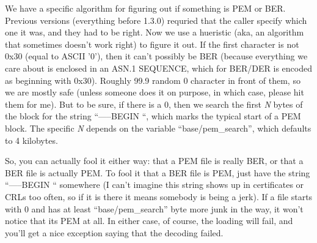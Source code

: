 \documentclass{article}
\begin{document}
We have a specific algorithm for figuring out if something is PEM or
BER. Previous versions (everything before 1.3.0) requried that the
caller specify which one it was, and they had to be right. Now we use
a hueristic (aka, an algorithm that sometimes doesn't work right) to
figure it out. If the first character is not 0x30 (equal to ASCII
'0'), then it can't possibly be BER (because everything we care about
is enclosed in an ASN.1 SEQUENCE, which for BER/DER is encoded as
beginning with 0x30). Roughly 99.9%
random 0 character in front of them, so we are mostly safe (unless
someone does it on purpose, in which case, please hit them for me).
But to be sure, if there is a 0, then we search the first \emph{N}
bytes of the block for the string ``-----BEGIN ``, which marks the
typical start of a PEM block. The specific \emph{N} depends on the
variable ``base/pem\_search'', which defaults to 4 kilobytes.

So, you can actually fool it either way: that a PEM file is really
BER, or that a BER file is actually PEM. To fool it that a BER file is
PEM, just have the string ``-----BEGIN `` somewhere (I can't imagine
this string shows up in certificates or CRLs too often, so if it is
there it means somebody is being a jerk). If a file starts with 0 and
has at least ``base/pem\_search'' byte more junk in the way, it won't
notice that its PEM at all. In either case, of course, the loading
will fail, and you'll get a nice exception saying that the decoding
failed.
\end{document}
